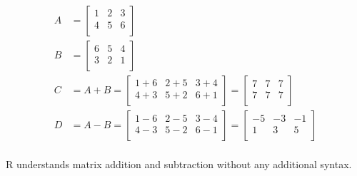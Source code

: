\begin{align}
    A &= \left [ \begin{matrix}
                    1 & 2 & 3 \\ 
                    4 & 5 & 6 \\
                \end{matrix}
        \right ] \\ 
    B &=  \left [ \begin{matrix}
                    6 & 5 & 4 \\ 
                    3 & 2 & 1 \\
                \end{matrix}
        \right ] \\
    C &= A + B = \left [ \begin{matrix}
                    1+6 & 2+5 & 3+4 \\ 
                    4+3 & 5+2 & 6+1 \\
                \end{matrix}
        \right ]  = \left [ \begin{matrix}
                    7 & 7 & 7 \\ 
                    7 & 7 & 7 \\
                \end{matrix}
        \right ] \\ 
    D &= A - B = \left [ \begin{matrix}
                    1-6 & 2-5 & 3-4 \\ 
                    4-3 & 5-2 & 6-1 \\
                \end{matrix}
        \right ]  = \left [ \begin{matrix}
                    -5 & -3 & -1 \\ 
                    1 & 3 & 5 \\
                \end{matrix}
        \right ] \\     
\end{align}

R understands matrix addition and subtraction without any additional
syntax.

